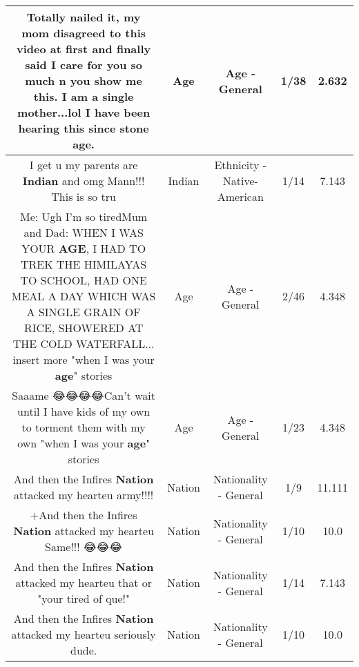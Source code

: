 \documentclass[11pt]{article}
\newlength\mylength
\begin{document}
\begin{center}
\begin{longtable}{|C{.65\mylength}|C{.30\mylength}|C{.12\mylength}|C{.12\mylength}|C{.12\mylength}|}
  \small Totally nailed it, my mom disagreed to this video at first and finally said I care for you so much n you show me this. I am a single mother...lol I have been hearing this since stone \textbf{age}.\normalsize   & Age & Age - General & 1/38 & 2.632 \\  \hline
  \small I get u my parents are \textbf{Indian} and omg Mann!!! This is so tru\normalsize   & Indian & Ethnicity - Native-American & 1/14 & 7.143 \\  \hline
  \small Me: Ugh I'm so tiredMum and Dad: WHEN I WAS YOUR \textbf{AGE}, I HAD TO TREK THE HIMILAYAS TO SCHOOL, HAD ONE MEAL A DAY WHICH WAS A SINGLE GRAIN OF RICE, SHOWERED AT THE COLD WATERFALL... insert more "when I was your \textbf{age}" stories\normalsize   & Age & Age - General & 2/46 & 4.348 \\  \hline
  \small Saaame 😂😂😂😂Can't wait until I have kids of my own to torment them with my own "when I was your \textbf{age}" stories\normalsize   & Age & Age - General & 1/23 & 4.348 \\  \hline
  \small And then the Infires \textbf{Nation} attacked my hearteu army!!!!\normalsize   & Nation & Nationality - General & 1/9 & 11.111 \\  \hline
  \small +And then the Infires \textbf{Nation} attacked my hearteu Same!!! 😂😂😂\normalsize   & Nation & Nationality - General & 1/10 & 10.0 \\  \hline
  \small And then the Infires \textbf{Nation} attacked my hearteu that or "your tired of que!"\normalsize   & Nation & Nationality - General & 1/14 & 7.143 \\  \hline
  \small And then the Infires \textbf{Nation} attacked my hearteu seriously dude.\normalsize   & Nation & Nationality - General & 1/10 & 10.0 \\  \hline

\end{longtable}
\end{center}
\end{document}
